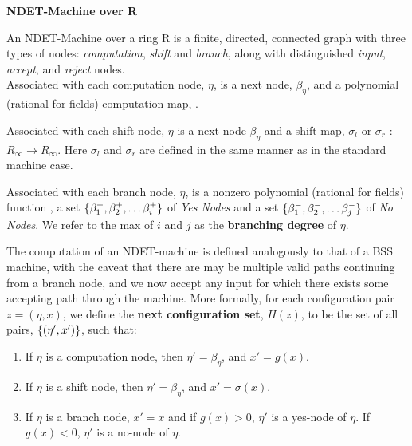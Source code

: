 \begin{definition} \textbf{NDET-Machine over R}

  An NDET-Machine over a ring R is a finite, directed, connected graph
  with three types of nodes: \emph{computation}, \emph{shift} and
  \emph{branch}, along with distinguished \emph{input}, \emph{accept}, 
  and \emph{reject} nodes.\\

  Associated with each computation node, $\eta$, is a next node,
  $\beta_{\eta}$, and a polynomial (rational for fields) computation
  map, .

  Associated with each shift node, $\eta$ is a next node $\beta_\eta$
  and a shift map, $\sigma_l$ or $\sigma_r$ : $R_\infty \rightarrow
  R_\infty$. Here $\sigma_l$ and $\sigma_r$ are defined in the same
  manner as in the standard machine case.

  Associated with each branch node, $\eta$, is a nonzero polynomial
  (rational for fields) function , a set
  $\{\beta^+_1, \beta^+_2, \ldots \beta^+_i\}$ of \emph{Yes Nodes}
  and a set $\{\beta^-_1, \beta^-_2, \ldots \beta^-_j\}$ of \emph{No
    Nodes}.  We refer to the max of $i$ and $j$ as the
  \textbf{branching degree} of $\eta$.
\end{definition}


The computation of an NDET-machine is defined analogously to that of a
BSS machine, with the caveat that there are may be multiple valid
paths continuing from a branch node, and we now accept any input for which
there exists some accepting path through the machine.  More formally,
for each configuration pair $z = (\eta, x)$, we define the
\textbf{next configuration set}, $H(z)$, to be the set of all pairs,
$\{(\eta', x')\}$, such that:

\begin{enumerate}
\item If $\eta$ is a computation node, then $\eta' = \beta_\eta$, and
  $x' = g(x)$.
\item If $\eta$ is a shift node, then $\eta' = \beta_\eta$, and
  $x' = \sigma(x)$.
\item If $\eta$ is a branch node, $x' = x$ and if $g(x) > 0$, $\eta'$
  is a yes-node of $\eta$.  If $g(x) < 0$, $\eta'$ is a no-node of
  $\eta$.
\end{enumerate}

